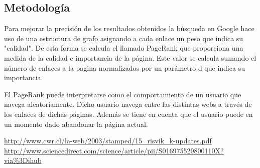 \documentclass[a4paper, 11pt]{article} %
\begin{document}
		\subsection{Metodología}
		Para mejorar la precisión de los resultados obtenidos la búsqueda en Google hace uso de una estructura de grafo asignando a cada enlace un peso que indica su "calidad".
		De esta forma se calcula el llamado PageRank que proporciona una medida de la calidad e importancia de la página. Este valor se calcula sumando el número de enlaces a la pagina normalizados por un parámetro d que indica su importancia.

		El PageRank puede interpretarse como el comportamiento de un usuario que navega aleatoriamente. Dicho usuario navega entre las distintas webs a través de los enlaces de dichas páginas. Además se tiene en cuenta que el usuario puede en un momento dado abandonar la página actual.

	\begin{thebibliography}{9}

		 \url{http://www.cwr.cl/la-web/2003/stamped/15_risvik_k-updates.pdf}
		 \url{http://www.sciencedirect.com/science/article/pii/S016975529800110X?via\%3Dihub}

	\end{thebibliography}
\end{document}

